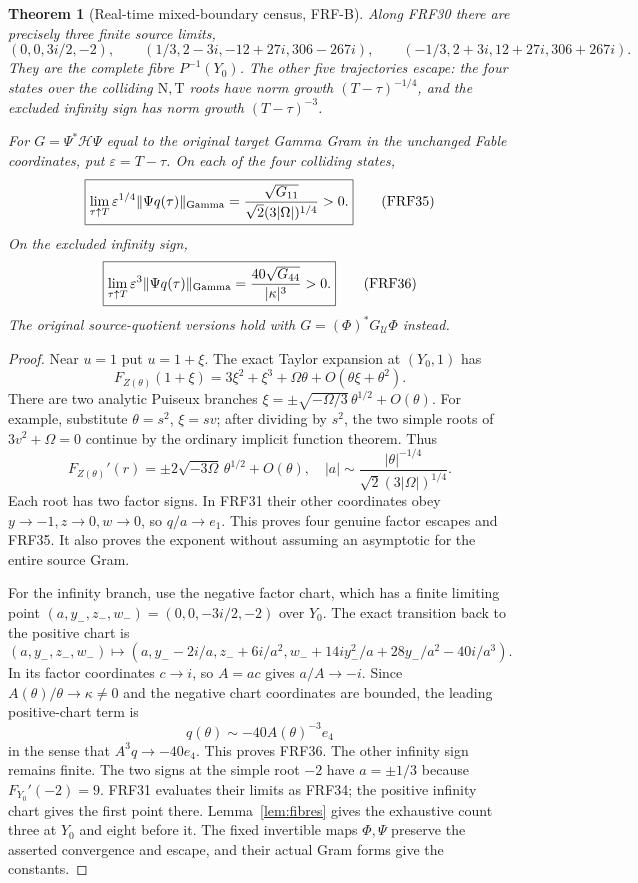 \documentclass[11pt]{article}
\newtheorem{theorem}{Theorem}
\begin{document}
\begin{theorem}[Real-time mixed-boundary census, FRF-B]\label{thm:branches}
Along FRF30 there are precisely three finite source limits,
\[
 (0,0,3i/2,-2),\qquad
 (1/3,2-3i,-12+27i,306-267i),\qquad
 (-1/3,2+3i,12+27i,306+267i).\tag{FRF34}
\]
They are the complete fibre $P^{-1}(Y_0)$. The other five trajectories
escape: the four states over the colliding $\mathrm N,\mathrm T$ roots
have norm growth $(T-\tau)^{-1/4}$, and the excluded infinity sign has
norm growth $(T-\tau)^{-3}$.

For $G=\Psi^*\mathcal H\Psi$ equal to the original target Gamma Gram
in the unchanged Fable coordinates, put $\varepsilon=T-\tau$. On each
of the four colliding states,
\[
 \boxed{\lim_{\tau\uparrow T}\varepsilon^{1/4}
       \|\Psi q(\tau)\|_{\rm Gamma}
       =\frac{\sqrt{G_{11}}}{\sqrt2(3|\Omega|)^{1/4}}>0.}\tag{FRF35}
\]
On the excluded infinity sign,
\[
 \boxed{\lim_{\tau\uparrow T}\varepsilon^3
       \|\Psi q(\tau)\|_{\rm Gamma}
       =\frac{40\sqrt{G_{44}}}{|\kappa|^3}>0.}\tag{FRF36}
\]
The original source-quotient versions hold with
$G=(\Phi)^*G_{\mathcal U}\Phi$ instead.
\end{theorem}
\begin{proof}
Near $u=1$ put $u=1+\xi$. The exact Taylor expansion at $(Y_0,1)$ has
\[
 F_{Z(\theta)}(1+\xi)=3\xi^2+\xi^3+\Omega\theta
                         +O(\theta\xi+\theta^2).
\]
There are two analytic Puiseux branches
$\xi=\pm\sqrt{-\Omega/3}\,\theta^{1/2}+O(\theta)$.
For example, substitute $\theta=s^2$, $\xi=s v$; after dividing by
$s^2$, the two simple roots of $3v^2+\Omega=0$ continue by the ordinary
implicit function theorem. Thus
\[
 F_{Z(\theta)}'(r)=\pm2\sqrt{-3\Omega}\,\theta^{1/2}+O(\theta),\quad
 |a|\sim\frac{|\theta|^{-1/4}}{\sqrt2(3|\Omega|)^{1/4}}.\tag{FRF37}
\]
Each root has two factor signs. In FRF31 their other coordinates obey
$y\to-1,z\to0,w\to0$, so $q/a\to e_1$. This proves four genuine
factor escapes and FRF35. It also proves the exponent without assuming
an asymptotic for the entire source Gram.

For the infinity branch, use the negative factor chart, which has a
finite limiting point $(a,y_-,z_-,w_-)=(0,0,-3i/2,-2)$ over $Y_0$.
The exact transition back to the positive chart is
\[
 (a,y_-,z_-,w_-)\mapsto
 (a,y_--2i/a,z_-+6i/a^2,
 w_-+14iy_-^2/a+28y_-/a^2-40i/a^3).\tag{FRF38}
\]
In its factor coordinates $c\to i$, so $A=ac$ gives
$a/A\to-i$. Since $A(\theta)/\theta\to\kappa\ne0$ and the negative
chart coordinates are bounded, the leading positive-chart term is
\[
 q(\theta)\sim -40 A(\theta)^{-3}e_4
\]
in the sense that $A^3q\to-40e_4$. This proves FRF36. The other infinity
sign remains finite. The two signs at the simple root $-2$ have
$a=\pm1/3$ because $F_{Y_0}'(-2)=9$. FRF31 evaluates their limits
as FRF34; the positive infinity chart gives the first point there.
Lemma~\ref{lem:fibres} gives the exhaustive count three at $Y_0$ and eight
before it. The fixed invertible maps $\Phi,\Psi$ preserve the asserted
convergence and escape, and their actual Gram forms give the constants.
\end{proof}
\end{document}
